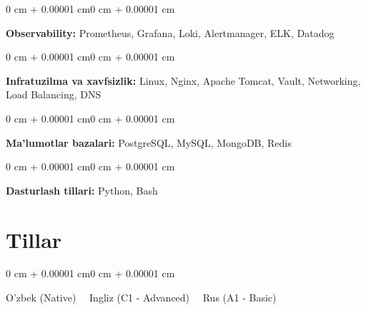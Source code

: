 \documentclass[10pt, letterpaper]{article}
\newenvironment{onecolentry}{
    \begin{adjustwidth}{0 cm + 0.00001 cm}{0 cm + 0.00001 cm}
}{
    \end{adjustwidth}
}
\begin{document}
\vspace{0.2 cm}

\begin{onecolentry}
\textbf{Observability:} Prometheus, Grafana, Loki, Alertmanager, ELK, Datadog
\end{onecolentry}

\vspace{0.2 cm}

\begin{onecolentry}
\textbf{Infratuzilma va xavfsizlik:} Linux, Nginx, Apache Tomcat, Vault, Networking, Load Balancing, DNS
\end{onecolentry}

\vspace{0.2 cm}

\begin{onecolentry}
\textbf{Ma'lumotlar bazalari:} PostgreSQL, MySQL, MongoDB, Redis
\end{onecolentry}

\vspace{0.2 cm}

\begin{onecolentry}
\textbf{Dasturlash tillari:} Python, Bash
\end{onecolentry}

    \section{Tillar}
    \begin{onecolentry}
        O'zbek (Native) \ \AND\ Ingliz (C1 - Advanced) \ \AND\ Rus (A1 - Basic)
    \end{onecolentry}
\end{document}
